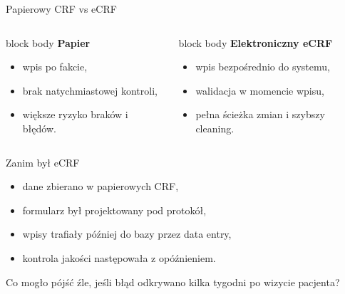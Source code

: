 \begin{frame}{Papierowy CRF vs eCRF}
  \begin{columns}[T,onlytextwidth]
    \begin{beamercolorbox}[wd=\linewidth,sep=0.8em,rounded=true]{block body}
      \textbf{\textcolor{UAFMOrange}{Papier}} \par\medskip
      \begin{itemize}
        \item wpis po fakcie,
        \item brak natychmiastowej kontroli,
        \item większe ryzyko braków i błędów.
      \end{itemize}
    \end{beamercolorbox}

    \begin{beamercolorbox}[wd=\linewidth,sep=0.8em,rounded=true]{block body}
      \textbf{\textcolor{UAFMTeal}{Elektroniczny eCRF}} \par\medskip
      \begin{itemize}
        \item wpis bezpośrednio do systemu,
        \item walidacja w momencie wpisu,
        \item pełna ścieżka zmian i szybszy cleaning.
      \end{itemize}
    \end{beamercolorbox}
  \end{columns}
\end{frame}

\begin{frame}{Zanim był eCRF}
  \begin{itemize}
    \item dane zbierano w papierowych CRF,
    \item formularz był projektowany pod protokół,
    \item wpisy trafiały później do bazy przez data entry,
    \item kontrola jakości następowała z opóźnieniem.
  \end{itemize}

  \vspace{0.3cm}

  \begin{QuestionBox}
    Co mogło pójść źle, jeśli błąd odkrywano kilka tygodni po wizycie pacjenta?
  \end{QuestionBox}
\end{frame}

